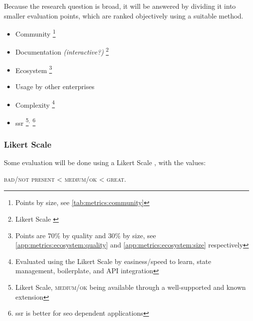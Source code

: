 Because the research question is broad, it will be answered by dividing it into smaller evaluation points, which are ranked objectively using a suitable method.

\begin{itemize}
    \item Community \footnote{Points by size, see \ref{tab:metrics:community}}
    \item Documentation \textit{(interactive?)} \footnote{Likert Scale \label{fn:likert_scale}}
    \item Ecosystem \footnote{Points are 70\% by quality and 30\% by size, see \ref{app:metrics:ecosystem:quality} and \ref{app:metrics:ecosystem:size} respectively}
    \item Usage by other enterprises 
    \item Complexity \footnote{Evaluated using the Likert Scale by easiness/speed to learn, state management, boilerplate, and API integration}
    \item \acrfull{ssr} \footnote{Likert Scale, \textsc{medium/ok} being available through a well-supported and known extension}$^,$ \footnote{\acrshort{ssr} is better for \acrshort{seo} dependent applications}
\end{itemize}

\subsubsection{Likert Scale}

Some evaluation will be done using a Likert Scale \cite{enwiki:likert_scale}, with the values:

\begin{center}
    \textsc{bad/not present} < \textsc{medium/ok} < \textsc{great}.
\end{center}
